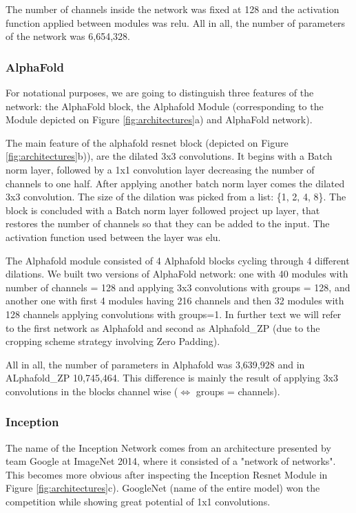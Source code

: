 The number of channels inside the network was fixed at 128 and the activation function applied between modules was relu. All in all, the number of parameters of the network was 6,654,328.

\subsubsection{AlphaFold}

For notational purposes, we are going to distinguish three features of the network: the AlphaFold block, the Alphafold Module (corresponding to the Module depicted on Figure \ref{fig:architectures}a) and AlphaFold network).

The main feature of the alphafold resnet block (depicted on Figure \ref{fig:architectures}b)), are the dilated 3x3 convolutions. It begins with a Batch norm layer, followed by a 1x1 convolution layer decreasing the number of channels to one half. After applying another batch norm layer comes the dilated 3x3 convolution. The size of the dilation was picked from a list: \{1, 2, 4, 8\}. The block is concluded with a Batch norm layer followed project up layer, that restores the number of channels so that they can be added to the input. The activation function used between the layer was elu.

The Alphafold module consisted of 4 Alphafold blocks cycling through 4 different dilations. We built two versions of AlphaFold network: one with 40 modules with number of channels = 128 and applying 3x3 convolutions with groups = 128, and another one with first 4 modules having 216 channels and then 32 modules with 128 channels applying convolutions with groups=1. In further text we will refer to the first network as Alphafold and second as Alphafold\_ZP (due to the cropping scheme strategy involving Zero Padding). 

All in all, the number of parameters in Alphafold was 3,639,928 and in ALphafold\_ZP 10,745,464. This difference is mainly the result of applying 3x3 convolutions in the blocks channel wise ($\Longleftrightarrow$ groups = channels).

\subsubsection{Inception}

The name of the Inception Network %
comes from an architecture presented by team Google at ImageNet 2014, where it consisted of a "network of networks".
This becomes more obvious after inspecting the Inception Resnet Module in Figure \ref{fig:architectures}c). GoogleNet (name of the entire model) won the competition while showing great potential of 1x1 convolutions.

